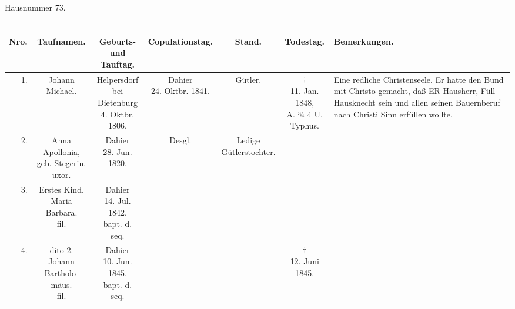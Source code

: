 \begin{quertabelle}
\begin{center}
Hausnummer 73.\\[0.3em]
{\large {}}\\[0.6em]
\footnotesize
\begin{tabular}{|r|c|c|c|c|c|p{3.6cm}|}
\hline
Nro. & Taufnamen. & \zl{Geburts- und\\ Tauftag.} & Copulationstag. & Stand. & Todestag. & \centering Bemerkungen. \tabularnewline \hline\hline
1. & Johann Michael. & \zl{Helpersdorf bei\\ Dietenburg\\ 4. Oktbr. 1806.} & \zl{Dahier\\ 24. Oktbr. 1841.} & Gütler. & \zl{†\\ 11. Jan. 1848,\\ A. ¾ 4 U.\\ Typhus.} & \scriptsize Eine redliche Christenseele. Er hatte den Bund mit Christo gemacht, daß ER Hausherr, Füll Hausknecht sein und allen seinen Bauernberuf nach Christi Sinn erfüllen wollte. \\ \hline
2. & \zl{Anna Apollonia,\\ geb. Stegerin.\\ uxor.} & \zl{Dahier\\ 28. Jun. 1820.} & Desgl. & \zl{Ledige\\ Gütlerstochter.} & & \\ \hline
3. & \zl{Erstes Kind.\\ Maria Barbara.\\ fil.} & \zl{Dahier\\ 14. Jul. 1842.\\ bapt. d. seq.} & & & & \\ \hline
4. & \zl{dito 2.\\ Johann Bartholo-\\ mäus.\\ fil.} & \zl{Dahier\\ 10. Jun. 1845.\\ bapt. d. seq.} & — & — & \zl{†\\ 12. Juni 1845.} & \\ \hline
\end{tabular}
\end{center}
\end{quertabelle}

